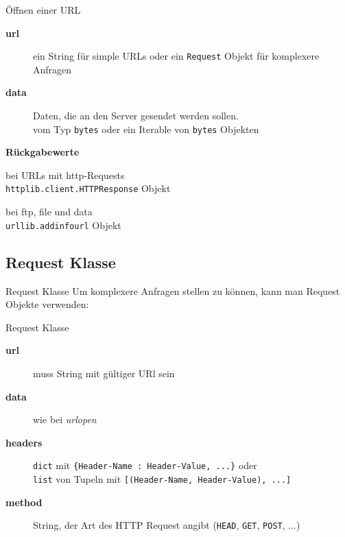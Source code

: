\begin{frame}[fragile]{Öffnen einer URL}
	\begin{description}
		\item[\textbf{url}] ein String für simple URLs oder ein \texttt{Request} Objekt für komplexere Anfragen
		\item[\textbf{data}] Daten, die an den Server gesendet werden sollen. \\
		vom Typ \texttt{bytes} oder ein Iterable von \texttt{bytes} Objekten \\[.75cm]
	\end{description}
	\textbf{Rückgabewerte}
	\begin{description}
		\item bei URLs mit http-Requests \\
		\hspace*{1cm}\texttt{httplib.client.HTTPResponse} Objekt
		\item bei ftp, file und data \\
		\hspace*{1cm}\texttt{urllib.addinfourl} Objekt
	\end{description}
\end{frame}

\subsection{Request Klasse}
\begin{frame}{Request Klasse}
	Um komplexere Anfragen stellen zu können, kann man Request Objekte verwenden:
	
\end{frame}

\begin{frame}{Request Klasse}
	\begin{description}
		\item[\textbf{url}] muss String mit gültiger URl sein
		\item[\textbf{data}] wie bei \textit{urlopen}
		\item[\textbf{headers}] \texttt{dict} mit \texttt{\{Header-Name : Header-Value, ...\}} oder \\
		\texttt{list} von Tupeln mit \texttt{[(Header-Name, Header-Value), ...]}
		\item[\textbf{method}] String, der Art des HTTP Request angibt (\texttt{HEAD}, \texttt{GET}, \texttt{POST}, ...)
	\end{description}
\end{frame}

